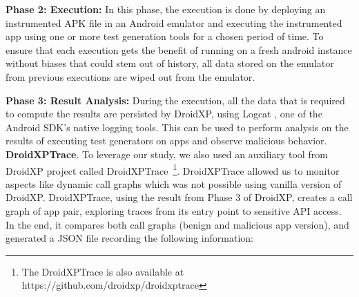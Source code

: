 \textbf{Phase 2: Execution:} In this phase, the execution is done by deploying an instrumented APK file in an Android emulator and executing the instrumented app using one or more test generation tools for a chosen period of time. To ensure that each execution gets the benefit of running on a fresh android instance without biases that could stem out of history, all data stored on the emulator from previous executions are wiped out from the emulator. 

\textbf{Phase 3: Result Analysis:} During the execution, all the data that is required to compute the results are persisted by DroidXP, using Logcat \cite{Logcat}, one of the Android SDK's native logging tools. This can be used to perform analysis on the results of executing test generators on apps and observe malicious behavior.\newline
\newline
\textbf{DroidXPTrace}. To leverage our study, we also used an auxiliary tool from DroidXP project called DroidXPTrace~\footnote{The DroidXPTrace is also available at https://github.com/droidxp/droidxptrace}. DroidXPTrace allowed us to monitor aspects like dynamic call graphs which was not possible using vanilla version of DroidXP. DroidXPTrace, using the result from Phase 3 of DroidXP, creates a call graph of app pair, exploring traces from its entry point to sensitive API access. In the end, it compares both call graphs (benign and malicious app version), and generated a JSON file recording the following information:

